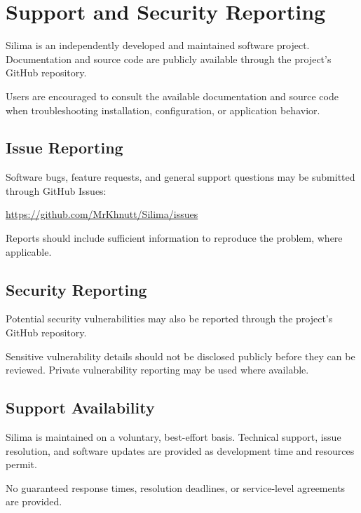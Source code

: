 \section{Support and Security Reporting}

Silima is an independently developed and maintained
software project. Documentation and source code are
publicly available through the project's GitHub repository.

Users are encouraged to consult the available documentation
and source code when troubleshooting installation,
configuration, or application behavior.

\subsection{Issue Reporting}

Software bugs, feature requests, and general support
questions may be submitted through GitHub Issues:

\url{https://github.com/MrKhnutt/Silima/issues}

Reports should include sufficient information to
reproduce the problem, where applicable.

\subsection{Security Reporting}

Potential security vulnerabilities may also be reported
through the project's GitHub repository.

Sensitive vulnerability details should not be disclosed
publicly before they can be reviewed. Private vulnerability
reporting may be used where available.

\subsection{Support Availability}

Silima is maintained on a voluntary, best-effort basis.
Technical support, issue resolution, and software updates
are provided as development time and resources permit.

No guaranteed response times, resolution deadlines,
or service-level agreements are provided.
